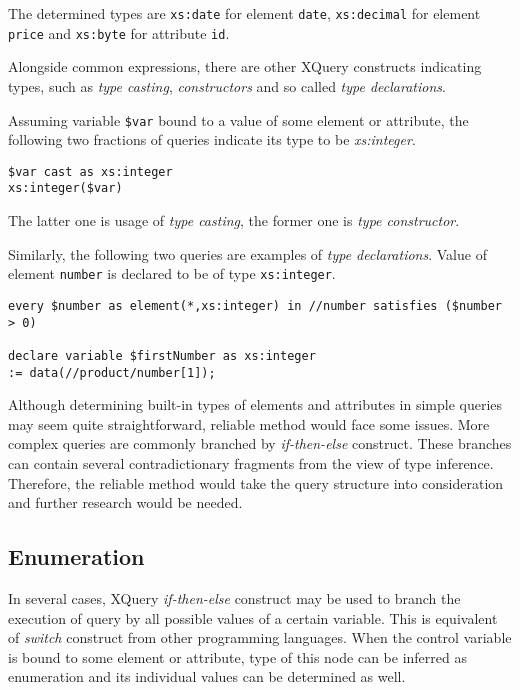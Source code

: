 The determined types are \texttt{xs:date} for element \texttt{date}, \texttt{xs:decimal} for element \texttt{price} and \texttt{xs:byte} for attribute \texttt{id}.

Alongside common expressions, there are other XQuery constructs indicating types, such as \emph{type casting}, \emph{constructors} and so called \emph{type declarations}.

Assuming variable \texttt{\$var} bound to a value of some element or attribute, the following two fractions of queries indicate its type to be \emph{xs:integer}.

\begin{verbatim}
$var cast as xs:integer
xs:integer($var)
\end{verbatim}

The latter one is usage of \emph{type casting}, the former one is \emph{type constructor}.

Similarly, the following two queries are examples of \emph{type declarations}. Value of element \texttt{number} is declared to be of type \texttt{xs:integer}.

\begin{verbatim}
every $number as element(*,xs:integer) in //number satisfies ($number > 0) 

declare variable $firstNumber as xs:integer 
:= data(//product/number[1]); 
\end{verbatim}

Although determining built-in types of elements and attributes in simple queries may seem quite straightforward, reliable method would face some issues. More complex queries are commonly branched by \emph{if-then-else} construct. These branches can contain several contradictionary fragments from the view of type inference. Therefore, the reliable method would take the query structure into consideration and further research would be needed.

\subsection{Enumeration}
In several cases, XQuery \emph{if-then-else} construct may be used to branch the execution of query by all possible values of a certain variable. This is equivalent of \emph{switch} construct from other programming languages. When the control variable is bound to some element or attribute, type of this node can be inferred as enumeration and its individual values can be determined as well.

